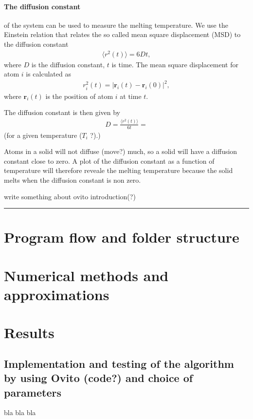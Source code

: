 \documentclass[11pt,a4wide]{article}
\renewcommand{\vec}{\mathbf}
\begin{document}
\paragraph{The diffusion constant} of the system can be used to measure the melting temperature. We use the Einstein relation that relates the so called mean square displacement (MSD) to the diffusion constant
\begin{align}
	\langle r^2(t) \rangle = 6Dt,
\end{align}
where $D$ is the diffusion constant, $t$ is time. The mean square displacement for atom $i$ is calculated as
\begin{align}
	r_i^2(t) = |\vec r_i(t) - \vec r_i(0)|^2,
\end{align}
where $\vec r_i(t)$ is the position of atom $i$ at time $t$. 

The diffusion constant is then given by
\begin{align*}
D = \frac{\langle r^2(t) \rangle}{6t} = 
\end{align*}
(for a given temperature ($T_i$ ?).)

Atoms in a solid will not diffuse (move?) much, so a solid will have a diffusion constant close to zero. A plot of the diffusion constant as a function of temperature will therefore reveale the melting temperature because the solid melts when the diffusion constant is non zero.

write something about ovito introduction(?)

\rule{0.3\textwidth}{0.4pt}\par %

\section{Program flow and folder structure}



\section{Numerical methods and approximations}


\section{Results} %

\subsection{Implementation and testing of the algorithm by using Ovito (code?) and choice of parameters}
bla bla bla
\end{document}
